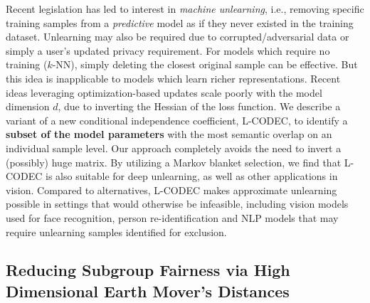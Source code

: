 Recent legislation has
led to interest in {\em machine unlearning}, i.e., removing specific training samples from a {\em predictive} model as if they never existed in the training dataset. 
Unlearning may also be required due to  corrupted/adversarial data or simply a user's updated privacy requirement.
For models which require no training ($k$-NN), 
simply deleting the closest original sample can be effective. 
But this idea is inapplicable to models which learn richer 
representations.
Recent ideas leveraging optimization-based updates
scale poorly with the model dimension $d$,  
due to 
inverting the Hessian of the loss function. %
We describe
a variant of a new conditional independence coefficient, 
L-CODEC, to identify a \textbf{subset of the model parameters} with the most semantic overlap on an individual sample level. 
Our approach completely avoids the need to invert a (possibly) huge matrix. 
By utilizing a Markov blanket selection, 
we find
that L-CODEC is also suitable for deep unlearning,
as well as other applications in vision.
Compared to alternatives, L-CODEC makes approximate unlearning possible 
in settings that would otherwise be infeasible, 
including vision models used for face recognition, 
person re-identification 
and NLP models that may require unlearning samples identified for exclusion.


\subsection{Reducing Subgroup Fairness via High Dimensional Earth Mover's Distances}

